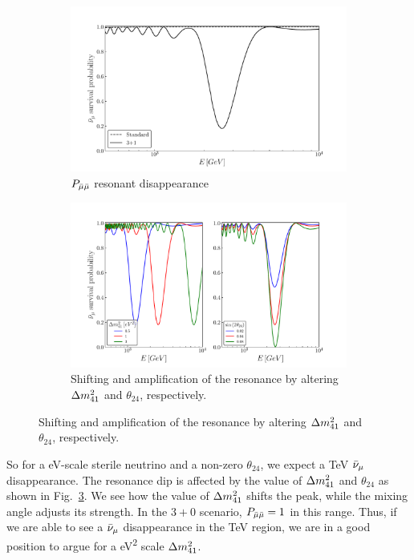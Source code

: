 \begin{figure}
    \centering
    \begin{subfigure}{0.7\textwidth}
        \includegraphics[width=1\linewidth]{figures/sterile_resonance.pdf}
        \caption{$P_{\bar{\mu} \bar{\mu}}$ resonant disappearance}\label{fig:sterile_resonance}
    \end{subfigure}
    \begin{subfigure}{0.9\textwidth}
        \includegraphics[width=1\linewidth]{figures/resonance_shift.pdf}
        \caption{Shifting and amplification of the resonance by altering $\dm[41]$ and $\theta_{24}$, respectively.}\label{fig:resonance_shift}
    \end{subfigure}
\end{figure}

So for a \si{\eV}-scale sterile neutrino and a non-zero $\theta_{24}$, we expect a \si{\TeV} $\bar{\nu}_\mu$ disappearance.
The resonance dip is affected by the value of $\dm[41]$ and $\theta_{24}$ as shown in Fig.~\ref{fig:resonance_shift}.
We see how the value of $\dm[41]$ shifts the peak, while the mixing angle adjusts its strength. 
In the $3+0$ scenario, $P_{\bar{\mu} \bar{\mu}} = 1$ in this range. Thus, if we are able to see a $\bar{\nu}_\mu$ disappearance in the \si{\TeV} region,
we are in a good position to argue for a \si{\eV^2} scale $\dm[41]$.


